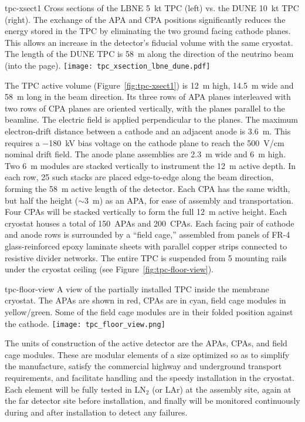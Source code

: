 \begin{cdrfigure}{tpc-xsect1}
{Cross sections of the LBNE 5~kt TPC (left) vs. the DUNE 10~kt TPC (right).  
The exchange of the APA and CPA positions significantly reduces the energy 
stored in the TPC by eliminating the two ground facing cathode planes. 
This allows an increase in the detector's fiducial volume with the same cryostat.  
The length of the DUNE TPC is  58~m along the direction of the neutrino beam (into the page).}
\texttt{[image: tpc\_xsection\_lbne\_dune.pdf]}
\end{cdrfigure}
The TPC active volume (Figure~\ref{fig:tpc-xsect1}) is 12~m high,
14.5~m wide and 58~m long in the beam direction.  
Its three rows of APA planes interleaved with two rows of CPA planes
are oriented vertically, with the planes parallel to the beamline. The
electric field is applied perpendicular to the planes.  The maximum
electron-drift distance between a cathode and an adjacent anode is
3.6~m. This requires a $-$180~kV bias voltage on the cathode plane to
reach the 500~V/cm nominal drift field. The anode plane assemblies are
2.3~m wide and 6~m high. Two 6~m modules are stacked vertically to
instrument the 12~m active depth. In each row, 25 such stacks are
placed edge-to-edge along the beam direction, forming the 58~m active
length of the detector.  Each CPA has the same width, but half the
height ($\sim$3~m) as an APA, for ease of assembly and transportation.
Four CPAs will be stacked vertically to form the full 12~m active
height.  Each cryostat houses a total of 150~APAs and 200~CPAs.  Each
facing pair of cathode and anode rows is surrounded by a ``field
cage,'' assembled from panels of FR-4 glass-reinforced epoxy laminate
sheets with parallel copper strips connected to resistive divider
networks.  The entire TPC is suspended from 5 mounting rails under the
cryostat ceiling (see Figure~\ref{fig:tpc-floor-view}).
\begin{cdrfigure}{tpc-floor-view}
{A view of the partially installed TPC inside the membrane cryostat.  
The APAs are shown in red, CPAs are in cyan, field cage modules in yellow/green. 
Some of the field cage modules are in their folded position against the cathode.}
\texttt{[image: tpc\_floor\_view.png]}
\end{cdrfigure}

The units of construction of the active detector are the APAs, CPAs,
and field cage modules. These are modular elements of a size optimized
so as to simplify the manufacture, satisfy the commercial highway and
underground transport requirements, and facilitate handling and the
speedy installation in the cryostat.  Each element will be fully
tested in LN$_2$ (or LAr) at the assembly site, again at the far
detector site before installation, and finally will be monitored
continuously during and after installation to detect any failures.


